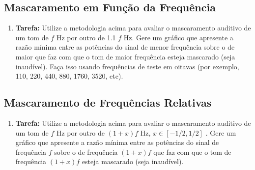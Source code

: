 \documentclass[11pt]{article}
\begin{document}
\subsection{Mascaramento em Função da Frequência}

\begin{enumerate}

\item \textbf{Tarefa:} Utilize a metodologia acima para avaliar o mascaramento auditivo de um tom de $f$ Hz por outro de 1.1 $f$ Hz. Gere um gráfico que apresente a razão mínima entre as potências do sinal de menor frequência sobre o de maior que faz com que o tom de maior frequência esteja mascarado (seja inaudível). Faça isso usando frequências de teste em oitavas (por exemplo, 110, 220, 440, 880, 1760, 3520, etc).

\end{enumerate}

\subsection{Mascaramento de Frequências Relativas}

\begin{enumerate}

\item \textbf{Tarefa:} Utilize a metodologia acima para avaliar o mascaramento auditivo de um tom de $f$ Hz por outro de   $(1+x)f$ Hz, $x\in[-1/2,1/2]$ . Gere um gráfico que apresente a razão mínima entre as potências do sinal de frequência $f$ sobre o de frequência $(1+x)f$ que faz com que o tom de frequência $(1+x)f$ esteja mascarado (seja inaudível). 

\end{enumerate}
\end{document}
